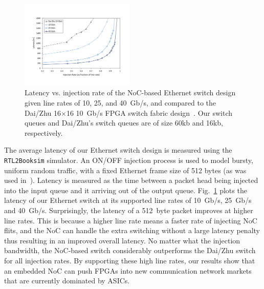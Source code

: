 \begin{figure}[t] \centering \vspace{0cm}
\includegraphics[width=0.485\textwidth, trim = 2cm 2.5cm 2cm 3.4cm, clip]{images/latency-chart-data-320-640.pdf}
\caption{Latency vs. injection rate of the NoC-based Ethernet switch design given line rates of 10, 25, and 40~Gb/s, and compared to the Dai/Zhu 16$\times$16 10~Gb/s FPGA switch fabric design~\cite{dai-zhu}. Our switch queues and Dai/Zhu's switch queues are of size 60kb and 16kb, respectively.}
\label{fig:lat-plot}
\vspace{0cm}
\end{figure}

The average latency of our Ethernet switch design is measured using the \texttt{RTL2Booksim} simulator.
An ON/OFF injection process is used to model bursty, uniform random traffic, with a fixed Ethernet frame size of 512 bytes (as was used in~\cite{dai-zhu}).
Latency is measured as the time between a packet head being injected into the input queue and it arriving out of the output queue.
Fig.~\ref{fig:lat-plot} plots the latency of our Ethernet switch at its supported line rates of 10~Gb/s, 25~Gb/s and 40~Gb/s.
Surprisingly, the latency of a 512~byte packet improves at higher line rates.
This is because a higher line rate means a faster rate of injecting NoC flits, and the NoC can handle the extra switching without a large latency penalty thus resulting in an improved overall latency.
No matter what the injection bandwidth, the NoC-based switch considerably outperforms the Dai/Zhu switch~\cite{dai-zhu} for all injection rates.
By supporting these high line rates, our results show that an embedded NoC can push FPGAs into new communication network markets that are currently dominated by ASICs.

